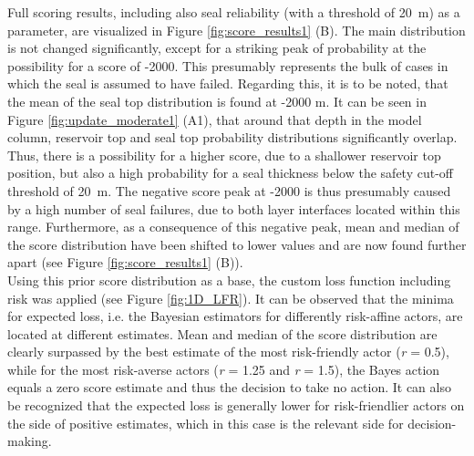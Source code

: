 			Full scoring results, including also seal reliability (with a threshold of 20~m) as a parameter, are visualized in Figure \ref{fig:score_results1} (B). The main distribution is not changed significantly, except for a striking peak of probability at the possibility for a score of -2000. This presumably represents the bulk of cases in which the seal is assumed to have failed. Regarding this, it is to be noted, that the mean of the seal top distribution is found at -2000 m. It can be seen in Figure \ref{fig:update_moderate1} (A1), that around that depth in the model column, reservoir top and seal top probability distributions significantly overlap. Thus, there is a possibility for a higher score, due to a shallower reservoir top position, but also a high probability for a seal thickness below the safety cut-off threshold of 20~m. The negative score peak at -2000 is thus presumably caused by a high number of seal failures, due to both layer interfaces located within this range. Furthermore, as a consequence of this negative peak, mean and median of the score distribution have been shifted to lower values and are now found further apart (see Figure \ref{fig:score_results1} (B)).\\
			Using this prior score distribution as a base, the custom loss function including risk was applied (see Figure \ref{fig:1D_LFR}). It can be observed that the minima for expected loss, i.e. the Bayesian estimators for differently risk-affine actors, are located at different estimates. Mean and median of the score distribution are clearly surpassed by the best estimate of the most risk-friendly actor (\textit{r} = 0.5), while for the most risk-averse actors (\textit{r} = 1.25 and \textit{r} = 1.5), the Bayes action equals a zero score estimate and thus the decision to take no action. It can also be recognized that the expected loss is generally lower for risk-friendlier actors on the side of positive estimates, which in this case is the relevant side for decision-making.		
